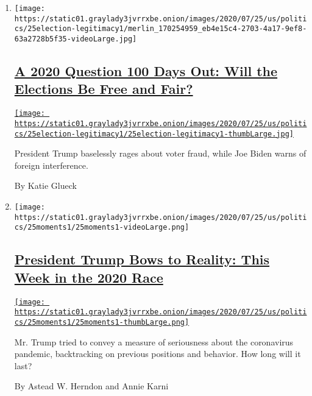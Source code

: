 \begin{enumerate}
\def\labelenumi{\arabic{enumi}.}
\item
  \texttt{[image: https://static01.graylady3jvrrxbe.onion/images/2020/07/25/us/politics/25election-legitimacy1/merlin\_170254959\_eb4e15c4-2703-4a17-9ef8-63a2728b5f35-videoLarge.jpg]}

  \hypertarget{a-2020-question-100-days-out-will-the-elections-be-free-and-fair}{%
  \subsection{\texorpdfstring{\href{/2020/07/25/us/politics/2020-election-voter-fraud-interference.html}{A
  2020 Question 100 Days Out: Will the Elections Be Free and
  Fair?}}{A 2020 Question 100 Days Out: Will the Elections Be Free and Fair?}}\label{a-2020-question-100-days-out-will-the-elections-be-free-and-fair}}

  \href{/2020/07/25/us/politics/2020-election-voter-fraud-interference.html}{\texttt{[image: https://static01.graylady3jvrrxbe.onion/images/2020/07/25/us/politics/25election-legitimacy1/25election-legitimacy1-thumbLarge.jpg]}}

  President Trump baselessly rages about voter fraud, while Joe Biden
  warns of foreign interference.

  By Katie Glueck
\item
  \texttt{[image: https://static01.graylady3jvrrxbe.onion/images/2020/07/25/us/politics/25moments1/25moments1-videoLarge.png]}

  \hypertarget{president-trump-bows-to-reality-this-week-in-the-2020-race}{%
  \subsection{\texorpdfstring{\href{/2020/07/25/us/politics/trump-biden-polls-coronavirus.html}{President
  Trump Bows to Reality: This Week in the 2020
  Race}}{President Trump Bows to Reality: This Week in the 2020 Race}}\label{president-trump-bows-to-reality-this-week-in-the-2020-race}}

  \href{/2020/07/25/us/politics/trump-biden-polls-coronavirus.html}{\texttt{[image: https://static01.graylady3jvrrxbe.onion/images/2020/07/25/us/politics/25moments1/25moments1-thumbLarge.png]}}

  Mr. Trump tried to convey a measure of seriousness about the
  coronavirus pandemic, backtracking on previous positions and behavior.
  How long will it last?

  By Astead W. Herndon and Annie Karni
\end{enumerate}

